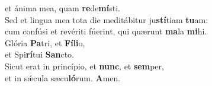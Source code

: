 \evenverse et ánima mea, quam \textbf{re}de\textbf{mí}sti.\\
\oddverse Sed et lingua mea tota die meditábitur ju\textbf{stí}tiam \textbf{tu}am:~\*\\
\oddverse cum confúsi et revériti fúerint, qui quærunt \textbf{ma}la \textbf{mi}hi.\\
\evenverse Glória \textbf{Pa}tri, et \textbf{Fí}\textbf{li}o,~\*\\
\evenverse et Spi\textbf{rí}tui \textbf{San}cto.\\
\oddverse Sicut erat in princípio, et \textbf{nunc}, et \textbf{sem}per,~\*\\
\oddverse et in sǽcula sæcu\textbf{ló}rum. \textbf{A}men.\\

